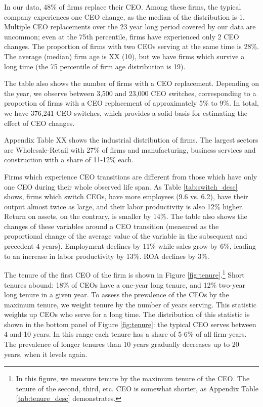 \documentclass[11pt,a4paper]{article}
\begin{document}
In our data, 48\% of firms replace their CEO. Among these firms, the typical company experiences one CEO change, as the median of the distribution is 1. Multiple CEO replacements over the 23 year long period covered by our data are uncommon; even at the 75th percentile, firms have experienced only 2 CEO changes. The proportion of firms with two CEOs serving at the same time is 28\%. The average (median) firm age is XX (10), but we have firms which survive a long time (the 75 percentile of firm age distribution is 19).

The table also shows the number of firms with a CEO replacement. Depending on the year, we observe between 3,500 and 23,000 CEO switches, corresponding to a proportion of firms with a CEO replacement of approximately 5\% to 9\%. In total, we have 376,241 CEO switches, which provides a solid basis for estimating the effect of CEO changes.

Appendix Table XX shows the industrial distribution of firms. The largest sectors are Wholesale-Retail with 27\% of firms and  manufacturing, business services and construction with a share of 11-12\% each.

Firms which experience CEO transitions are different from those which have only one CEO during their whole observed life span. As Table \ref{tab:switch_desc} shows, firms which switch CEOs, have more employees (9.6 vs. 6.2), have their output almost twice as large, and their labor productivity is also 12\% higher. Return on assets, on the contrary, is smaller by 14\%. The table also shows the changes of these variables around a CEO transition (measured as the proportional change of the average value of the variable in the subsequent and precedent 4 years). Employment declines by 11\% while sales grow by 6\%, leading to an increase in labor productivity by 13\%. ROA declines by 3\%.  

The tenure of the first CEO of the firm is shown in Figure \ref{fig:tenure}.\footnote{In this figure, we measure tenure by the maximum tenure of the CEO. The tenure of the second, third, etc. CEO is somewhat shorter, as Appendix Table \ref{tab:tenure_desc} demonstrates.} Short tenures abound: 18\% of CEOs have a one-year long tenure, and 12\% two-year long tenure in a given year. To assess the prevalence of the CEOs by the maximum tenure, we weight tenure by the number of years serving. This statistic weights up CEOs who serve for a long time. The  distribution of this statistic is shown in the bottom panel of Figure \ref{fig:tenure}: the typical CEO serves between 4 and 10 years. In this range each tenure has a share of 5-6\% of all firm-years. The prevalence of longer tenures than 10 years gradually decreases up to 20 years, when it levels again. 
\end{document}
